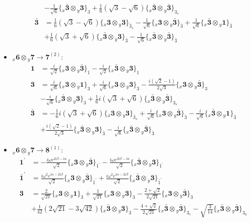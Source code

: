 \documentclass[english]{article}
\newcommand{\rep}[1]{\mathbf{#1}}
\newcommand{\repx}[2]{{}_{#2}\mathbf{#1}}
\newcommand{\subcg}[3]{\big\{ \repx{#1}{x}\otimes\repx{#2}{y}\big\}^{}_{#3}}
\begin{document}
\begin{itemize}
\begin{align*}
 & -\frac{1}{\sqrt{6}}\subcg{\bar{3}}{3}{3}+\frac{1}{6} \left(\sqrt{3}-\sqrt{6}\right)\subcg{\bar{3}}{\bar{3}}{3_{s}}
\\
\rep{\bar{3}} & = \frac{1}{6} \left(\sqrt{3}-\sqrt{6}\right)\subcg{3}{3}{\bar{3}_{s}}-\frac{1}{\sqrt{6}}\subcg{3}{\bar{3}}{\bar{3}}+\frac{1}{\sqrt{6}}\subcg{\bar{3}}{1}{\bar{3}} \\ 
 & +\frac{1}{6} \left(\sqrt{3}+\sqrt{6}\right)\subcg{\bar{3}}{3}{\bar{3}}-\frac{1}{\sqrt{6}}\subcg{\bar{3}}{\bar{3}}{\bar{3}}
\end{align*}
\item $\repx{6}{x}\otimes\repx{7}{y}\to\rep{7}^{(2)}$:
\begin{align*}
\rep{1} & = \frac{i}{\sqrt{2}}\subcg{3}{\bar{3}}{1}-\frac{i}{\sqrt{2}}\subcg{\bar{3}}{3}{1}
\\
\rep{3} & = \frac{i}{\sqrt{6}}\subcg{3}{1}{3}+\frac{i}{\sqrt{6}}\subcg{3}{3}{3}-\frac{i \left(\sqrt{2}-1\right)}{2 \sqrt{3}}\subcg{3}{\bar{3}}{3} \\ 
 & -\frac{i}{\sqrt{6}}\subcg{\bar{3}}{3}{3}+\frac{1}{6} i \left(\sqrt{3}+\sqrt{6}\right)\subcg{\bar{3}}{\bar{3}}{3_{s}}
\\
\rep{\bar{3}} & = -\frac{1}{6} i \left(\sqrt{3}+\sqrt{6}\right)\subcg{3}{3}{\bar{3}_{s}}+\frac{i}{\sqrt{6}}\subcg{3}{\bar{3}}{\bar{3}}-\frac{i}{\sqrt{6}}\subcg{\bar{3}}{1}{\bar{3}} \\ 
 & +\frac{i \left(\sqrt{2}-1\right)}{2 \sqrt{3}}\subcg{\bar{3}}{3}{\bar{3}}-\frac{i}{\sqrt{6}}\subcg{\bar{3}}{\bar{3}}{\bar{3}}
\end{align*}
\item $\repx{6}{x}\otimes\repx{7}{y}\to\rep{8}^{(1)}$:
\begin{align*}
\rep{1^{\prime}} & = -\frac{i \omega  e^{2 i \beta -i \alpha }}{\sqrt{2}}\subcg{3}{\bar{3}}{1^{\prime}}-\frac{i \omega  e^{2 i \beta -i \alpha }}{\sqrt{2}}\subcg{\bar{3}}{3}{1^{\prime}}
\\
\rep{\bar{1}^{\prime}} & = \frac{i \omega ^2 e^{i \alpha -2 i \beta }}{\sqrt{2}}\subcg{3}{\bar{3}}{\bar{1}^{\prime}}+\frac{i \omega ^2 e^{i \alpha -2 i \beta }}{\sqrt{2}}\subcg{\bar{3}}{3}{\bar{1}^{\prime}}
\\
\rep{3} & = \frac{2}{\sqrt{21}}\subcg{3}{1}{3}+\frac{1}{\sqrt{21}}\subcg{3}{3}{3}-\frac{2+\sqrt{2}}{2 \sqrt{21}}\subcg{3}{\bar{3}}{3} \\ 
 & +\frac{1}{42} \left(2 \sqrt{21}-3 \sqrt{42}\right)\subcg{\bar{3}}{3}{3}-\frac{4+\sqrt{2}}{2 \sqrt{21}}\subcg{\bar{3}}{\bar{3}}{3_{s}}-\sqrt{\frac{3}{14}}\subcg{\bar{3}}{\bar{3}}{3_{a}}

\end{align*}
\end{itemize}
\end{document}
